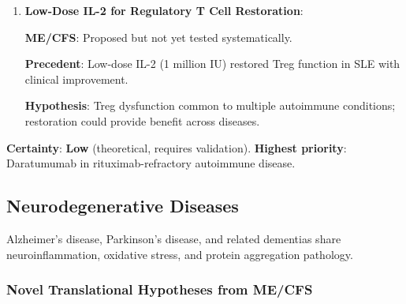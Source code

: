 \begin{enumerate}
    \textbf{Implication}: Combined autoantibody removal + JAK inhibitors (monocyte modulation) could be more effective than either alone.

    \item \textbf{Low-Dose IL-2 for Regulatory T Cell Restoration}:

    \textbf{ME/CFS}: Proposed but not yet tested systematically.

    \textbf{Precedent}: Low-dose IL-2 (1 million IU) restored Treg function in SLE with clinical improvement.

    \textbf{Hypothesis}: Treg dysfunction common to multiple autoimmune conditions; restoration could provide benefit across diseases.
\end{enumerate}

\textbf{Certainty}: \textbf{Low} (theoretical, requires validation). \textbf{Highest priority}: Daratumumab in rituximab-refractory autoimmune disease.

\subsection{Neurodegenerative Diseases}
\label{sec:neurodegenerative}

Alzheimer's disease, Parkinson's disease, and related dementias share neuroinflammation, oxidative stress, and protein aggregation pathology.

\subsubsection{Novel Translational Hypotheses from ME/CFS}

